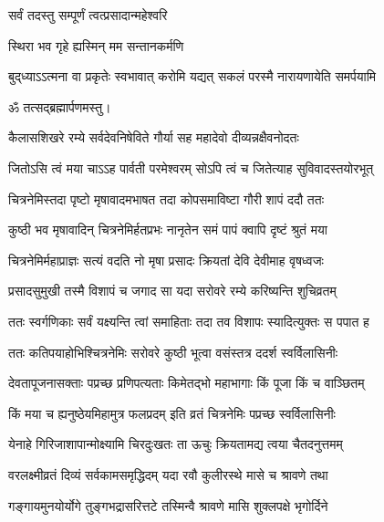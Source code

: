 
{सर्वं तदस्तु सम्पूर्णं त्वत्प्रसादान्महेश्वरि}

{स्थिरा भव गृहे ह्यस्मिन् मम सन्तानकर्मणि}


{बुद्‌ध्याऽऽत्मना वा प्रकृतेः स्वभावात्}
{करोमि यद्यत् सकलं परस्मै}
{नारायणायेति समर्पयामि}

ॐ तत्सद्ब्रह्मार्पणमस्तु।



\twolineshloka
{कैलासशिखरे रम्ये सर्वदेवनिषेविते}
{गौर्या सह महादेवो दीव्यन्नक्षैवनोदतः}%


\twolineshloka
{जितोऽसि त्वं मया चाऽऽह पार्वती परमेश्वरम्}
{सोऽपि त्वं च जितेत्याह सुविवादस्तयोरभूत्}%


\twolineshloka
{चित्रनेमिस्तदा पृष्टो मृषावादमभाषत}
{तदा कोपसमाविष्टा गौरी शापं ददौ ततः}%


\twolineshloka
{कुष्ठी भव मृषावादिन् चित्रनेमिर्हतप्रभः}
{नानृतेन समं पापं क्वापि दृष्टं श्रुतं मया}%


\twolineshloka
{चित्रनेमिर्महाप्राज्ञः सत्यं वदति नो मृषा}
{प्रसादः क्रियतां देवि देवीमाह वृषध्वजः}%


\twolineshloka
{प्रसादसुमुखी तस्मै विशापं च जगाद सा}
{यदा सरोवरे रम्ये करिष्यन्ति शुचिव्रतम्}%


\twolineshloka
{ततः स्वर्गणिकाः सर्वं यक्ष्यन्ति त्वां समाहिताः}
{तदा तव विशापः स्यादित्युक्तः स पपात ह}%


\twolineshloka
{ततः कतिपयाहोभिश्चित्रनेमिः सरोवरे}
{कुष्ठी भूत्वा वसंस्तत्र ददर्श स्वर्विलासिनीः}%


\twolineshloka
{देवतापूजनासक्ताः पप्रच्छ प्रणिपत्यताः}
{किमेतद्भो महाभागाः किं पूजा किं च वाञ्छितम्}%


\twolineshloka
{किं मया च ह्यनुष्ठेयमिहामुत्र फलप्रदम्}
{इति व्रतं चित्रनेमिः पप्रच्छ स्वर्विलासिनीः}%


\twolineshloka
{येनाहे गिरिजाशापान्मोक्ष्यामि चिरदुःखतः}
{ता ऊचुः क्रियतामद्य त्वया चैतदनुत्तमम्}%


\twolineshloka
{वरलक्ष्मीव्रतं दिव्यं सर्वकामसमृद्धिदम्}
{यदा रवौ कुलीरस्थे मासे च श्रावणे तथा}%


\twolineshloka
{गङ्गायमुनयोर्योगे तुङ्गभद्रासरित्तटे}
{तस्मिन्वै श्रावणे मासि शुक्लपक्षे भृगोर्दिने}%


